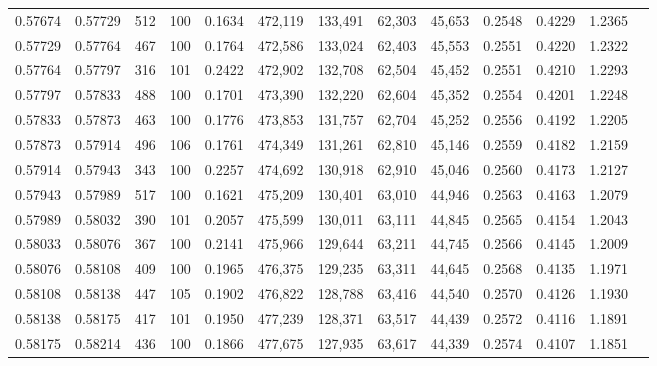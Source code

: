 \begin{tabular}{rrrrrrrrrrrrr}
0.57674 & 0.57729 &   512 & 100 &                                     0.1634 & 472,119 & 133,491 &  62,303 &  45,653 & 0.2548 & 0.4229 & 1.2365 \\
0.57729 & 0.57764 &   467 & 100 &                                     0.1764 & 472,586 & 133,024 &  62,403 &  45,553 & 0.2551 & 0.4220 & 1.2322 \\
0.57764 & 0.57797 &   316 & 101 &                                     0.2422 & 472,902 & 132,708 &  62,504 &  45,452 & 0.2551 & 0.4210 & 1.2293 \\
0.57797 & 0.57833 &   488 & 100 &                                     0.1701 & 473,390 & 132,220 &  62,604 &  45,352 & 0.2554 & 0.4201 & 1.2248 \\
0.57833 & 0.57873 &   463 & 100 &                                     0.1776 & 473,853 & 131,757 &  62,704 &  45,252 & 0.2556 & 0.4192 & 1.2205 \\
0.57873 & 0.57914 &   496 & 106 &                                     0.1761 & 474,349 & 131,261 &  62,810 &  45,146 & 0.2559 & 0.4182 & 1.2159 \\
0.57914 & 0.57943 &   343 & 100 &                                     0.2257 & 474,692 & 130,918 &  62,910 &  45,046 & 0.2560 & 0.4173 & 1.2127 \\
0.57943 & 0.57989 &   517 & 100 &                                     0.1621 & 475,209 & 130,401 &  63,010 &  44,946 & 0.2563 & 0.4163 & 1.2079 \\
0.57989 & 0.58032 &   390 & 101 &                                     0.2057 & 475,599 & 130,011 &  63,111 &  44,845 & 0.2565 & 0.4154 & 1.2043 \\
0.58033 & 0.58076 &   367 & 100 &                                     0.2141 & 475,966 & 129,644 &  63,211 &  44,745 & 0.2566 & 0.4145 & 1.2009 \\
0.58076 & 0.58108 &   409 & 100 &                                     0.1965 & 476,375 & 129,235 &  63,311 &  44,645 & 0.2568 & 0.4135 & 1.1971 \\
0.58108 & 0.58138 &   447 & 105 &                                     0.1902 & 476,822 & 128,788 &  63,416 &  44,540 & 0.2570 & 0.4126 & 1.1930 \\
0.58138 & 0.58175 &   417 & 101 &                                     0.1950 & 477,239 & 128,371 &  63,517 &  44,439 & 0.2572 & 0.4116 & 1.1891 \\
0.58175 & 0.58214 &   436 & 100 &                                     0.1866 & 477,675 & 127,935 &  63,617 &  44,339 & 0.2574 & 0.4107 & 1.1851 \\

\end{tabular}
